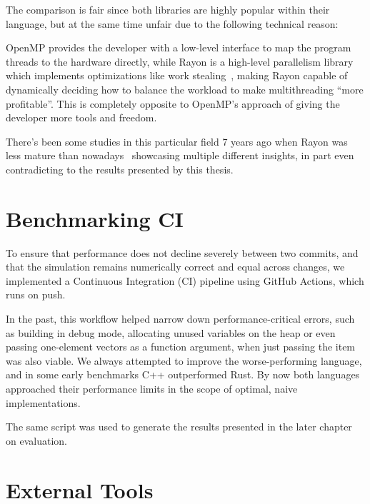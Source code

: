 \documentclass[11pt,
               a4paper,
               bibtotoc,
               idxtotoc,
               headsepline,
               footsepline,
               footexclude,
               BCOR12mm,
               DIV13,
               openany,   %
               ]
               {scrbook}
\begin{document}
The comparison is fair since both libraries are highly popular within their language, but at the same time unfair due to the following technical reason:

OpenMP provides the developer with a low-level interface to map the program threads to the hardware directly, while Rayon is a high-level parallelism library which implements optimizations like work stealing~\cite{rust-rayon-work-stealing}, making Rayon capable of dynamically deciding how to balance the workload to make multithreading ``more profitable''. This is completely opposite to OpenMP's approach of giving the developer more tools and freedom.

There's been some studies in this particular field 7 years ago when Rayon was less mature than nowadays~\cite{rust-rayon-carnegie-mellon-university} showcasing multiple different insights, in part even contradicting to the results presented by this thesis.


\section{Benchmarking CI}

To ensure that performance does not decline severely    between two commits, and that the simulation remains numerically correct and equal across changes, we implemented a Continuous Integration (CI) pipeline using GitHub Actions, which runs on push.

In the past, this workflow helped narrow down performance-critical errors, such as building in debug mode, allocating unused variables on the heap or even passing one-element vectors as a function argument, when just passing the item was also viable. We always attempted to improve the worse-performing language, and in some early benchmarks C++ outperformed Rust. By now both languages approached their performance limits in the scope of optimal, naive implementations.

The same script was used to generate the results presented in the later chapter on evaluation.

\section{External Tools}
\end{document}
